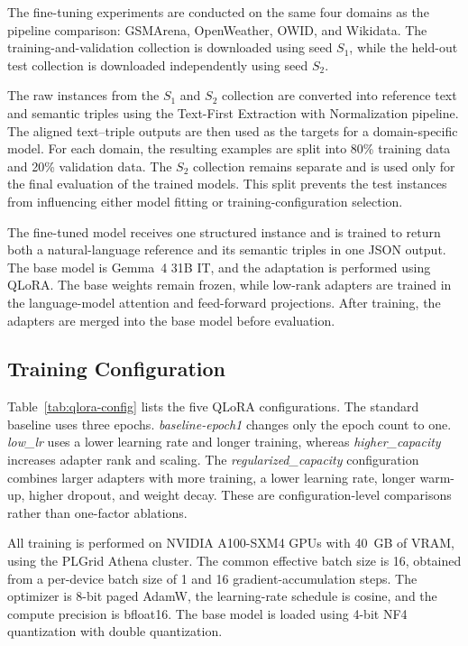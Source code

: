 The fine-tuning experiments are conducted on the same four domains as the
pipeline comparison: GSMArena, OpenWeather, OWID, and Wikidata. The
training-and-validation collection is downloaded using seed $S_1$, while the
held-out test collection is downloaded independently using seed $S_2$.

The raw instances from the $S_1$ and $S_2$ collection are converted into reference text
and semantic triples using the Text-First Extraction with Normalization
pipeline. The aligned text--triple outputs are then used as the targets for a
domain-specific model. For each domain, the resulting examples are split into
80\% training data and 20\% validation data. The $S_2$ collection remains
separate and is used only for the final evaluation of the trained models. This
split prevents the test instances from influencing either model fitting or
training-configuration selection.

The fine-tuned model receives one structured instance and is trained to return
both a natural-language reference and its semantic triples in one JSON output.
The base model is Gemma~4 31B IT, and the adaptation is performed using QLoRA.
The base weights remain frozen, while low-rank adapters are trained in the
language-model attention and feed-forward projections. After training, the
adapters are merged into the base model before evaluation.

\subsection{Training Configuration}

Table~\ref{tab:qlora-config} lists the five QLoRA configurations. The standard
baseline uses three epochs. \emph{baseline-epoch1} changes only the epoch count
to one. \emph{low\_lr} uses a lower learning rate and longer training, whereas
\emph{higher\_capacity} increases adapter rank and scaling. The
\emph{regularized\_capacity} configuration combines larger adapters with more
training, a lower learning rate, longer warm-up, higher dropout, and weight
decay. These are configuration-level comparisons rather than one-factor
ablations.

All training is performed on NVIDIA A100-SXM4 GPUs with 40~GB of VRAM, using
the PLGrid Athena cluster. The common effective batch size is 16, obtained
from a per-device batch size of 1 and 16 gradient-accumulation steps. The
optimizer is 8-bit paged AdamW, the learning-rate schedule is cosine, and the
compute precision is bfloat16. The base model is loaded using 4-bit NF4
quantization with double quantization.

